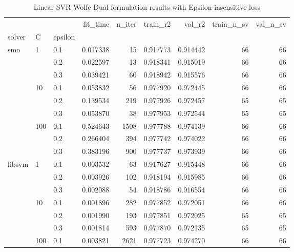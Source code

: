 \begin{table}[H]
\centering
\caption{Linear SVR Wolfe Dual formulation results with Epsilon-insensitive loss}
\label{linear_dual_svr_cv_results}
\begin{tabular}{lllrrrrrr}
\toprule
       &     &     &  fit\_time &  n\_iter &  train\_r2 &    val\_r2 &  train\_n\_sv &  val\_n\_sv \\
solver & C & epsilon &           &         &           &           &             &           \\
\midrule
smo & 1   & 0.1 &  0.017338 &      15 &  0.917773 &  0.914442 &          66 &        66 \\
       &     & 0.2 &  0.022597 &      13 &  0.918341 &  0.915019 &          66 &        66 \\
       &     & 0.3 &  0.039421 &      60 &  0.918942 &  0.915576 &          66 &        66 \\
       & 10  & 0.1 &  0.053832 &      56 &  0.977920 &  0.972445 &          66 &        66 \\
       &     & 0.2 &  0.139534 &     219 &  0.977926 &  0.972457 &          65 &        65 \\
       &     & 0.3 &  0.053870 &      38 &  0.977953 &  0.972544 &          65 &        65 \\
       & 100 & 0.1 &  0.524643 &    1508 &  0.977788 &  0.974139 &          66 &        66 \\
       &     & 0.2 &  0.266404 &     394 &  0.977742 &  0.974022 &          66 &        66 \\
       &     & 0.3 &  0.383196 &     900 &  0.977737 &  0.973939 &          66 &        66 \\
libsvm & 1   & 0.1 &  0.003532 &      63 &  0.917627 &  0.915448 &          66 &        66 \\
       &     & 0.2 &  0.003926 &     102 &  0.918194 &  0.915985 &          66 &        66 \\
       &     & 0.3 &  0.002088 &      54 &  0.918786 &  0.916554 &          66 &        66 \\
       & 10  & 0.1 &  0.001896 &     282 &  0.977852 &  0.972051 &          66 &        66 \\
       &     & 0.2 &  0.001990 &     193 &  0.977851 &  0.972025 &          65 &        65 \\
       &     & 0.3 &  0.001814 &     593 &  0.977870 &  0.972135 &          65 &        65 \\
       & 100 & 0.1 &  0.003821 &    2621 &  0.977723 &  0.974270 &          66 &        66 \\

\end{tabular}
\end{table}
